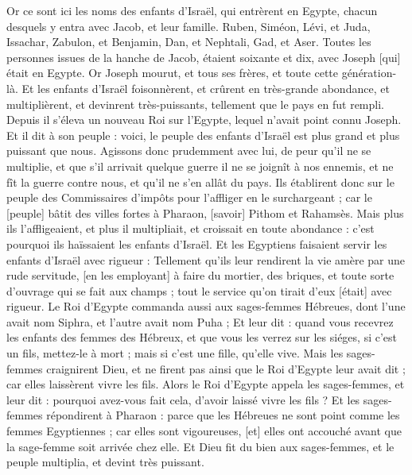 \BFont
\begin{multicols}{2}
\VerseOne{}Or ce sont ici les noms des enfants d'Israël, qui entrèrent en Egypte, chacun desquels y entra avec Jacob, et leur famille.
Ruben, Siméon, Lévi, et Juda,
Issachar, Zabulon, et Benjamin,
Dan, et Nephtali, Gad, et Aser.
Toutes les personnes issues de la hanche de Jacob, étaient soixante et dix, avec Joseph [qui] était en Egypte.
Or Joseph mourut, et tous ses frères, et toute cette génération-là.
Et les enfants d'Israël foisonnèrent, et crûrent en très-grande abondance, et multiplièrent, et devinrent très-puissants, tellement que le pays en fut rempli.
Depuis il s'éleva un nouveau Roi sur l'Egypte, lequel n'avait point connu Joseph.
Et il dit à son peuple : voici, le peuple des enfants d'Israël est plus grand et plus puissant que nous.
Agissons donc prudemment avec lui, de peur qu'il ne se multiplie, et que s'il arrivait quelque guerre il ne se joignît à nos ennemis, et ne fît la guerre contre nous, et qu'il ne s'en allât du pays.
Ils établirent donc sur le peuple des Commissaires d'impôts pour l'affliger en le surchargeant ; car le [peuple] bâtit des villes fortes à Pharaon, [savoir] Pithom et Rahamsès.
Mais plus ils l'affligeaient, et plus il multipliait, et croissait en toute abondance : c'est pourquoi ils haïssaient les enfants d'Israël.
Et les Egyptiens faisaient servir les enfants d'Israël avec rigueur :
Tellement qu'ils leur rendirent la vie amère par une rude servitude, [en les employant] à faire du mortier, des briques, et toute sorte d'ouvrage qui se fait aux champs ; tout le service qu'on tirait d'eux [était] avec rigueur.
Le Roi d'Egypte commanda aussi aux sages-femmes Hébreues, dont l'une avait nom Siphra, et l'autre avait nom Puha ;
Et leur dit : quand vous recevrez les enfants des femmes des Hébreux, et que vous les verrez sur les siéges, si c'est un fils, mettez-le à mort ; mais si c'est une fille, qu'elle vive.
Mais les sages-femmes craignirent Dieu, et ne firent pas ainsi que le Roi d'Egypte leur avait dit ; car elles laissèrent vivre les fils.
Alors le Roi d'Egypte appela les sages-femmes, et leur dit : pourquoi avez-vous fait cela, d'avoir laissé vivre les fils ?
Et les sages-femmes répondirent à Pharaon : parce que les Hébreues ne sont point comme les femmes Egyptiennes ; car elles sont vigoureuses, [et] elles ont accouché avant que la sage-femme soit arrivée chez elle.
Et Dieu fit du bien aux sages-femmes, et le peuple multiplia, et devint très puissant.

\end{multicols}
